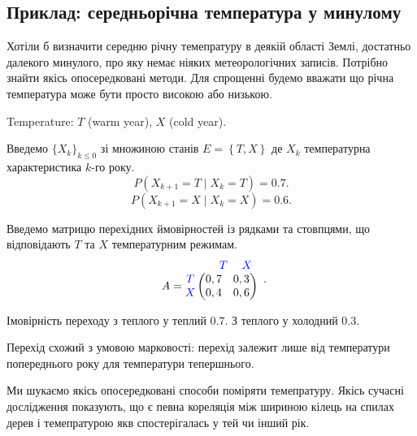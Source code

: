 
\subsection{Приклад: середньорічна температура у минулому}
\begin{example}
Хотіли б визначити середню річну темепратуру в деякій області Землі, достатньо далекого минулого,
про яку немає ніяких метеорологічних записів. Потрібно знайти якісь опосередковані методи. Для
спрощенні будемо вважати що річна температура може бути просто високою або низькою.

Temperature: $T$ (warm year),  $X$ (cold year).

Введемо $\{X_k\}_{k \leq 0}$ зі множиною станів $E = \left\{ T, X \right\}$ де
$X_k$ температурна \\ характеристика $k$-го року.
\[
P \left( X_{k+1} = T  \mid X_k = T \right) = 0.7
.\] 
\[
P \left( X_{k+1} = X  \mid X_k = X \right) = 0.6
.\] 

Введемо матрицю перехідних ймовірностей із рядками та стовпцями, що\\
відповідають $T$ та $X$ температурним режимам.
\[
\begin{array}{rcl}
 \color{blue}\begin{array}{c} T \quad\; X \end{array}\\
  A =
  \color{blue}\begin{matrix} T \\ X \\ \end{matrix}
  \color{black}
  \begin{pmatrix}0,7&0,3\\0,4&0,6\\\end{pmatrix}&\hspace{-1em}  
\end{array}
.\]

Імовірність переходу з теплого у теплий $0.7$. З теплого у холодний  $0.3$.

Перехід схожий з умовою марковості: перехід залежит лише від температури попереднього року
для температури тепершнього.


Ми шукаємо якісь опосередковані способи поміряти темепратуру. Якісь
сучасні дослідження показують, що є певна кореляція між шириною кілець на спилах дерев
і темепратурою якв спостерігалась у тей чи інший рік.


\end{example}
